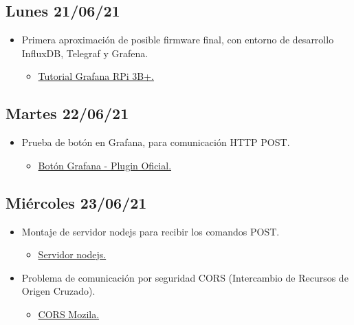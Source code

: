 \subsection*{Lunes 21/06/21}
    \begin{itemize}
        \item Primera aproximación de posible firmware final, con entorno de desarrollo InfluxDB, Telegraf y Grafena. 
        \begin{itemize}
            \item \href{http://pdacontroles.com/instalacion-completa-dashboard-grafana-en-raspberry-pi-3-b-b/}{Tutorial Grafana RPi 3B+.}
        \end{itemize}
    \end{itemize}
    
\subsection*{Martes 22/06/21}
    \begin{itemize}
        \item Prueba de botón en Grafana, para comunicación HTTP POST.
        \begin{itemize}
            \item \href{https://grafana.com/grafana/plugins/cloudspout-button-panel/}{Botón Grafana - Plugin Oficial.}
        \end{itemize}
    \end{itemize}
    
\subsection*{Miércoles 23/06/21}
    \begin{itemize}
        \item Montaje de servidor nodejs para recibir los comandos POST.
        \begin{itemize}
            \item \href{https://www.npmjs.com/package/server}{Servidor nodejs.}
        \end{itemize}
        \item Problema de comunicación por seguridad CORS (Intercambio de Recursos de Origen Cruzado).
        \begin{itemize}
            \item \href{https://developer.mozilla.org/es/docs/Web/HTTP/CORS}{CORS Mozila.}
        \end{itemize}
    \end{itemize}
    
